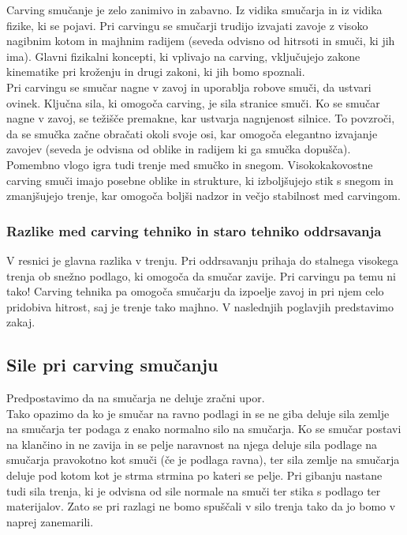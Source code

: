 \documentclass{article}
\begin{document}
Carving smučanje je zelo zanimivo in zabavno. Iz vidika smučarja in iz vidika fizike, ki se pojavi.
Pri carvingu se smučarji trudijo izvajati zavoje z visoko nagibnim kotom in majhnim radijem (seveda odvisno od hitrsoti in smuči, ki jih ima). 
Glavni fizikalni koncepti, ki vplivajo na carving, vključujejo zakone kinematike pri kroženju in drugi zakoni, ki jih bomo spoznali. \\ \newline
Pri carvingu se smučar nagne v zavoj in uporablja robove smuči, da ustvari ovinek. Ključna sila, 
ki omogoča carving, je sila stranice smuči. Ko se smučar nagne v zavoj, se težišče premakne, kar ustvarja nagnjenost silnice. 
To povzroči, da se smučka začne obračati okoli svoje osi, kar omogoča elegantno izvajanje zavojev (seveda je odvisna od oblike in radijem ki ga smučka dopušča).\\ \newline
Pomembno vlogo igra tudi trenje med smučko in snegom. Visokokakovostne carving smuči imajo posebne oblike in strukture, 
ki izboljšujejo stik s snegom in zmanjšujejo trenje, kar omogoča boljši nadzor in večjo stabilnost med carvingom.

\subsubsection*{Razlike med carving tehniko in staro tehniko oddrsavanja}

V resnici je glavna razlika v trenju. Pri oddrsavanju prihaja do stalnega visokega trenja ob snežno podlago, ki omogoča da smučar zavije.
Pri carvingu pa temu ni tako! Carving tehnika pa omogoča smučarju da izpoelje zavoj in pri njem celo pridobiva hitrost, saj je trenje tako majhno. 
V naslednjih poglavjih predstavimo zakaj.

\subsection*{Sile pri carving smučanju}
Predpostavimo da na smučarja ne deluje zračni upor. \\ \newline
Tako opazimo da ko je smučar na ravno podlagi in se ne giba deluje sila zemlje na smučarja ter podaga z enako normalno silo na smučarja. 
Ko se smučar postavi na klančino in ne zavija in se pelje naravnost na njega deluje sila podlage na smučarja pravokotno kot smuči (če je podlaga ravna),
ter sila zemlje na smučarja deluje pod kotom kot je strma strmina po kateri se pelje. Pri gibanju nastane tudi sila trenja, ki je odvisna od 
sile normale na smuči ter stika s podlago ter materijalov. Zato se pri razlagi ne bomo spuščali v silo trenja tako da jo bomo v naprej zanemarili.
\end{document}

